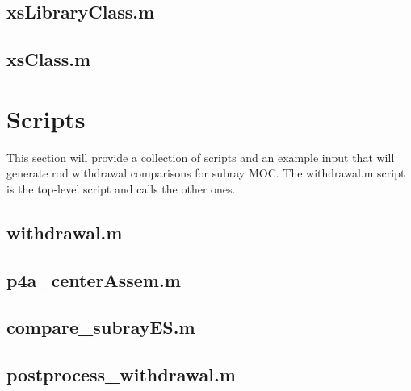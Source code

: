 

\subsection{xsLibraryClass.m}



\subsection{xsClass.m}



\section{Scripts}

This section will provide a collection of scripts and an example input that will generate rod withdrawal comparisons for subray MOC.  The withdrawal.m script is the top-level script and calls the other ones.

\subsection{withdrawal.m}



\subsection{p4a\_centerAssem.m}



\subsection{compare\_subrayES.m}



\subsection{postprocess\_withdrawal.m}


